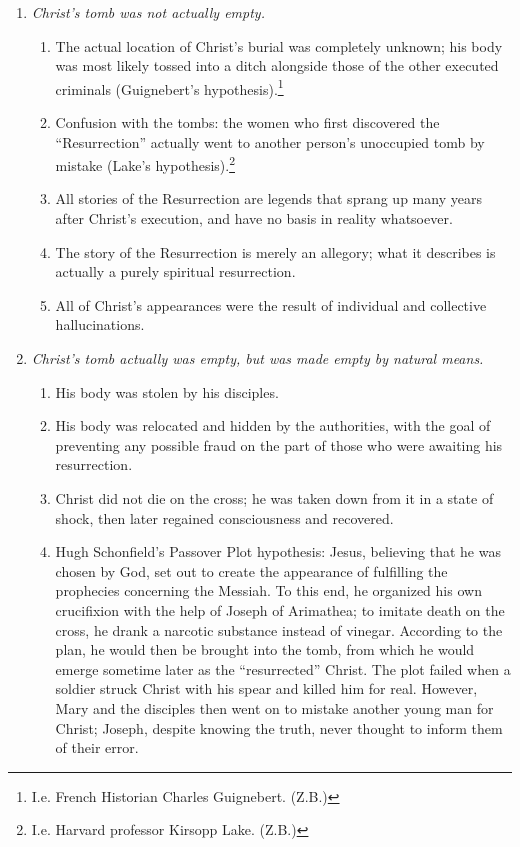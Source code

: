 \begin{enumerate}
    \item[I.] \emph{Christ's tomb was not actually empty.}
    \begin{enumerate}
        \item[1.] The actual location of Christ's burial was completely unknown; his body was most likely tossed into a ditch alongside those of the other executed criminals (Guignebert's hypothesis).\footnote{I.e. French Historian Charles Guignebert. (Z.B.)}
        \item[2.] Confusion with the tombs: the women who first discovered the ``Resurrection'' actually went to another person's unoccupied tomb by mistake (Lake's hypothesis).\footnote{I.e. Harvard professor Kirsopp Lake. (Z.B.)}
        \item[3.] All stories of the Resurrection are legends that sprang up many years after Christ's execution, and have no basis in reality whatsoever.
        \item[4.] The story of the Resurrection is merely an allegory; what it describes is actually a purely spiritual resurrection.
        \item[5.] All of Christ's appearances were the result of individual and collective hallucinations.
    \end{enumerate}
    \item[II.] \emph{Christ's tomb actually was empty, but was made empty by natural
    means.}
    \begin{enumerate}
        \item[1.] His body was stolen by his disciples.
        \item[2.] His body was relocated and hidden by the authorities, with the goal of preventing any possible fraud on the part of those who were awaiting his resurrection.
        \item[3.] Christ did not die on the cross; he was taken down from it in a state of shock, then later regained consciousness and recovered. 
        \item[4.] Hugh Schonfield's Passover Plot hypothesis: Jesus, believing that he was chosen by God, set out to create the appearance of fulfilling the prophecies concerning the Messiah. To this end, he organized his own crucifixion with the help of Joseph of Arimathea; to imitate death on the cross, he drank a narcotic substance instead of vinegar. According to the plan, he would then be brought into the tomb, from which he would emerge sometime later as the ``resurrected'' Christ. The plot failed when a soldier struck Christ with his spear and killed him for real. However, Mary and the disciples then went on to mistake another young man for Christ; Joseph, despite knowing the truth, never thought to inform them of their error. 
    \end{enumerate}
\end{enumerate}


